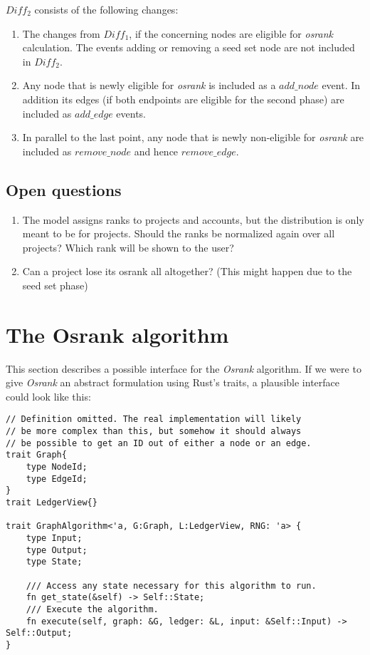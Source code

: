 \documentclass{article}
\begin{document}
$Diff_2$ consists of the following changes:
\begin{enumerate}
  \item The changes from $Diff_1$, if the concerning nodes are eligible for \textit{osrank}
  calculation. The events adding or removing a seed set node are not included in $Diff_2$.
  \item Any node that is newly eligible for \textit{osrank} is included as a $add\_node$
  event. In addition its edges (if both endpoints are eligible for the second phase) are
  included as $add\_edge$ events.
  \item In parallel to the last point, any node that is newly non-eligible for \textit{osrank}
  are included as $remove\_node$ and hence $remove\_edge$.
\end{enumerate}

\subsection{Open questions}
\begin{enumerate}
  \item The model assigns ranks to projects and accounts, but the distribution
  is only meant to be for projects. Should the ranks be normalized again over all
  projects? Which rank will be shown to the user?
  \item Can a project lose its osrank all altogether? (This might happen due to
  the seed set phase)

\end{enumerate}

\section{The Osrank algorithm}

This section describes a possible interface for the \textit{Osrank}
algorithm. If we were to give \textit{Osrank} an abstract
formulation using Rust's traits, a plausible interface could look
like this:

\begin{verbatim}
// Definition omitted. The real implementation will likely
// be more complex than this, but somehow it should always
// be possible to get an ID out of either a node or an edge.
trait Graph{
    type NodeId;
    type EdgeId;
}
trait LedgerView{}

trait GraphAlgorithm<'a, G:Graph, L:LedgerView, RNG: 'a> {
    type Input;
    type Output;
    type State;

    /// Access any state necessary for this algorithm to run.
    fn get_state(&self) -> Self::State;
    /// Execute the algorithm.
    fn execute(self, graph: &G, ledger: &L, input: &Self::Input) -> Self::Output;
}
\end{verbatim}
\end{document}
